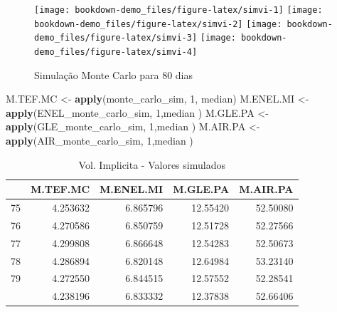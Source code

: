 \documentclass[
  12pt,
  a4paper,
  openany]{book}
\newenvironment{Shaded}{\begin{snugshade}}{\end{snugshade}}
\newcommand{\DecValTok}[1]{\textcolor[rgb]{0.00,0.00,0.81}{#1}}
\newcommand{\KeywordTok}[1]{\textcolor[rgb]{0.13,0.29,0.53}{\textbf{#1}}}
\newcommand{\NormalTok}[1]{#1}
\newcommand{\StringTok}[1]{\textcolor[rgb]{0.31,0.60,0.02}{#1}}
\begin{document}
\scriptsize

\normalsize

\scriptsize

\normalsize

\begin{figure}

{\centering \texttt{[image: bookdown-demo\_files/figure-latex/simvi-1]} \texttt{[image: bookdown-demo\_files/figure-latex/simvi-2]} \texttt{[image: bookdown-demo\_files/figure-latex/simvi-3]} \texttt{[image: bookdown-demo\_files/figure-latex/simvi-4]} 

}

\caption{Simulação Monte Carlo para 80 dias}\label{fig:simvi}
\end{figure}

\scriptsize

\begin{Shaded}
\begin{Highlighting}[]
\NormalTok{M.TEF.MC \textless{}{-}}\StringTok{ }\KeywordTok{apply}\NormalTok{(monte\_carlo\_sim, }\DecValTok{1}\NormalTok{, median)}
\NormalTok{M.ENEL.MI \textless{}{-}}\StringTok{ }\KeywordTok{apply}\NormalTok{(ENEL\_monte\_carlo\_sim, }\DecValTok{1}\NormalTok{,median )}
\NormalTok{M.GLE.PA \textless{}{-}}\StringTok{ }\KeywordTok{apply}\NormalTok{(GLE\_monte\_carlo\_sim, }\DecValTok{1}\NormalTok{,median )}
\NormalTok{M.AIR.PA \textless{}{-}}\StringTok{ }\KeywordTok{apply}\NormalTok{(AIR\_monte\_carlo\_sim, }\DecValTok{1}\NormalTok{,median )}
\end{Highlighting}
\end{Shaded}

\normalsize
\begin{table}[!h]

\caption{\label{tab:unnamed-chunk-62}Vol. Implicita - Valores simulados}
\centering
\begin{tabular}[t]{lrrrr}
\toprule
  & M.TEF.MC & M.ENEL.MI & M.GLE.PA & M.AIR.PA\\
\midrule
75 & 4.253632 & 6.865796 & 12.55420 & 52.50080\\
76 & 4.270586 & 6.850759 & 12.51728 & 52.27566\\
77 & 4.299808 & 6.866648 & 12.54283 & 52.50673\\
78 & 4.286894 & 6.820148 & 12.64984 & 53.23140\\
79 & 4.272550 & 6.844515 & 12.57552 & 52.28541\\
\addlinespace
80 & 4.238196 & 6.833332 & 12.37838 & 52.66406\\
\bottomrule
\end{tabular}
\end{table}
\FloatBarrier
\centering
\end{document}
